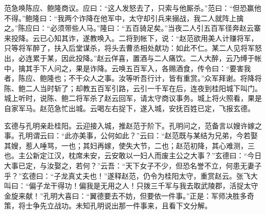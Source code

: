 范急唤陈应、鲍隆商议。应曰：“这人发怒去了，只索与他厮杀。”范曰：“但恐赢他不得。”鲍隆曰：“我两个诈降在他军中，太守却引兵来搦战，我二人就阵上擒之。”陈应曰：“必须带些人马。”隆曰：“五百骑足矣。”当夜二人引五百军径奔赵云寨来投降。云已心知其诈，遂教唤入。二将到帐下，说：“赵范欲用美人计赚将军，只等将军醉了，扶入后堂谋杀，将头去曹丞相处献功：如此不仁。某二人见将军怒出，必连累于某，因此投降。”赵云佯喜，置酒与二人痛饮。二人大醉，云乃缚于帐中，擒其手下人问之，果是诈降。云唤五百军入，各赐酒食，传令曰：“要害我者，陈应、鲍隆也；不干众人之事。汝等听吾行计，皆有重赏。”众军拜谢。将降将陈、鲍二人当时斩了；却教五百军引路，云引一千军在后，连夜到桂阳城下叫门。城上听时，说陈、鲍二将军杀了赵云回军，请太守商议事务。城上将火照看，果是自家军马。赵范急忙出城。云喝左右捉下，遂入城，安抚百姓已定，飞报玄德。

玄德与孔明亲赴桂阳。云迎接入城，推赵范于阶下。孔明问之，范备言以嫂许嫁之事。孔明谓云曰：“此亦美事，公何如此？”云曰：“赵范既与某结为兄弟，今若娶其嫂，惹人唾骂，一也；其妇再嫁，使失大节，二也；赵范初降，其心难测，三也。主公新定江汉，枕席未安，云安敢以一妇人而废主公之大事？”玄德曰：“今日大事已定，与汝娶之，若何？”云吾：“天下女子不少，但恐名誉不立，何患无妻子乎？”玄德曰：“子龙真丈夫也！”遂释赵范，仍令为桂阳太守，重赏赵云。张飞大叫曰：“偏子龙干得功！偏我是无用之人！只拨三千军与我去取武陵郡，活捉太守金旋来献！”孔明大喜曰：“翼德要去不妨，但要依一件事。”正是：军师决胜多奇策，将士争先立战功。未知孔明说出那一件事来，且看下文分解。